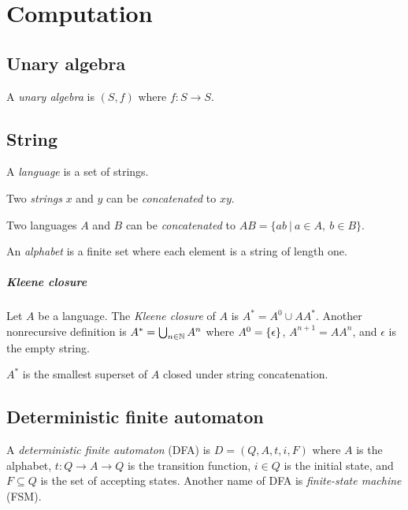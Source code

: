 \chapter{Computation}

\section{Unary algebra}

%
A \emph{unary algebra} is \((S,f)\) where \(f : S \to S\).

\section{String}

%
A \emph{language} is a set of strings.

Two
%
\emph{strings}
\(x\) and \(y\) can be
%
%
\emph{concatenated} to \(xy\).

Two languages \(A\) and \(B\) can be
%
%
\emph{concatenated} to
\(AB = \{ ab ~|~ a \in A, ~ b \in B \}\).

%
An \emph{alphabet} is a finite set where each element is a string of length one.

\paragraph{Kleene closure}
Let \(A\) be a language.
The
%
%
%
\emph{Kleene closure}
of \(A\) is \(A^* = A^0 \cup AA^*\).
Another nonrecursive definition is
\( A^* = \bigcup_{n \in \mathbb{N}} A^n \)
where \( A^0 = \{\epsilon\} \),
\( A^{n+1} = A A^n \),
and \(\epsilon\) is the
%
%
empty string.

\(A^*\) is the smallest superset of \(A\)
closed under string concatenation.

\section{Deterministic finite automaton}


A
%
\emph{deterministic finite automaton} (DFA) is \(D = (Q,A,t,i,F)\) where
\(A\) is the alphabet,
\(t : Q \to A \to Q\) is the transition function,
\(i \in Q\) is the initial state,
and \(F \subseteq Q\) is the set of accepting states.
Another name of DFA is
%
\emph{finite-state machine} (FSM).

